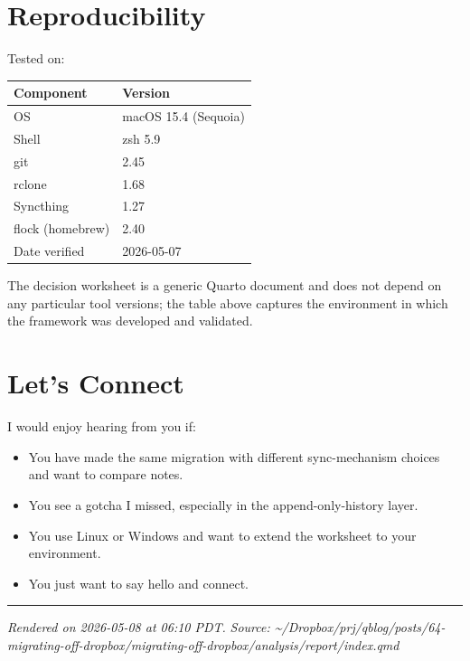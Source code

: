 \documentclass[
  11pt,
  letterpaper,
  DIV=11,
  numbers=noendperiod]{scrartcl}
\providecommand{\tightlist}{%
  \setlength{\itemsep}{0pt}\setlength{\parskip}{0pt}}\usepackage{longtable,booktabs,array}
\begin{document}
\section{Reproducibility}\label{reproducibility}

Tested on:

\begin{longtable}[]{@{}ll@{}}
\toprule\noalign{}
Component & Version \\
\midrule\noalign{}
\endhead
\bottomrule\noalign{}
\endlastfoot
OS & macOS 15.4 (Sequoia) \\
Shell & zsh 5.9 \\
git & 2.45 \\
rclone & 1.68 \\
Syncthing & 1.27 \\
flock (homebrew) & 2.40 \\
Date verified & 2026-05-07 \\
\end{longtable}

The decision worksheet is a generic Quarto document and does not depend
on any particular tool versions; the table above captures the
environment in which the framework was developed and validated.

\section{Let's Connect}\label{lets-connect}

I would enjoy hearing from you if:

\begin{itemize}
\tightlist
\item
  You have made the same migration with different sync-mechanism choices
  and want to compare notes.
\item
  You see a gotcha I missed, especially in the append-only-history
  layer.
\item
  You use Linux or Windows and want to extend the worksheet to your
  environment.
\item
  You just want to say hello and connect.
\end{itemize}

\begin{center}\rule{0.5\linewidth}{0.5pt}\end{center}

\emph{Rendered on 2026-05-08 at 06:10 PDT.} \emph{Source:
\textasciitilde/Dropbox/prj/qblog/posts/64-migrating-off-dropbox/migrating-off-dropbox/analysis/report/index.qmd}
\end{document}
